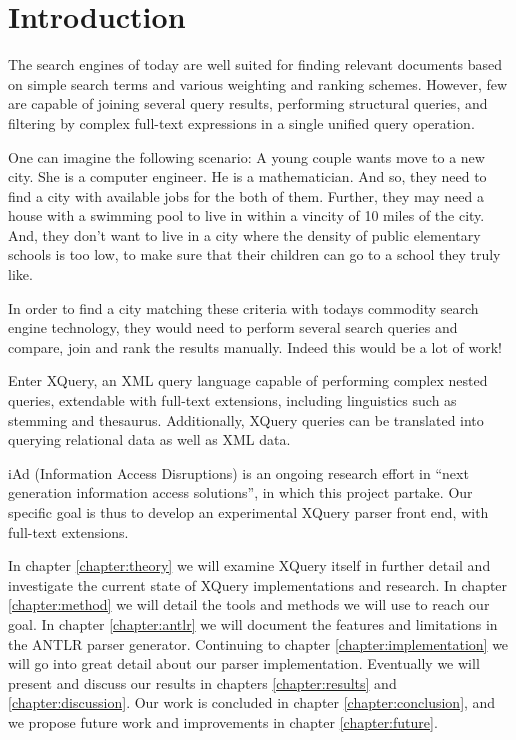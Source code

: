 \chapter{Introduction}
The search engines of today are well suited for finding relevant documents based
on simple search terms and various weighting and ranking schemes. However, few 
are capable of joining several query results, performing structural queries, and
filtering by complex full-text expressions in a single unified query operation.

One can imagine the following scenario: A young couple wants move to a new city.
She is a computer engineer. He is a mathematician. And so, they need to find
a city with available jobs for the both of them. Further, they may need a house
with a swimming pool to live in within a vincity of 10 miles of the city. And,
they don't want to live in a city where the density of public elementary schools
is too low, to make sure that their children can go to a school they truly like.

In order to find a city matching these criteria with todays commodity search
engine technology, they would need to perform several search queries and
compare, join and rank the results manually. Indeed this would be a lot of work!

Enter XQuery, an XML query language capable of performing complex nested
queries, extendable with full-text extensions, including linguistics such as
stemming and thesaurus. Additionally, XQuery queries can be translated into
querying relational
data\cite{pathfinder_comptech}\cite{pathfinder_staircase}\cite{galatex}\cite{datadirect} 
as well as XML data.

iAd \cite{iadcentre} (Information Access Disruptions) is an ongoing research
effort in ``next generation information access solutions'', in which this
project partake. Our specific goal is thus to develop an experimental XQuery
parser front end, with full-text extensions.

In chapter \ref{chapter:theory} we will examine XQuery itself in further detail
and investigate the current state of XQuery implementations and research. In
chapter \ref{chapter:method} we will detail the tools and methods we will use to
reach our goal. In chapter \ref{chapter:antlr} we will document the features and
limitations in the ANTLR parser generator. Continuing to chapter
\ref{chapter:implementation} we will go into great detail about our parser
implementation. Eventually we will present and discuss our results in
chapters \ref{chapter:results} and \ref{chapter:discussion}. Our work is
concluded in chapter \ref{chapter:conclusion}, and we propose future work and
improvements in chapter \ref{chapter:future}.